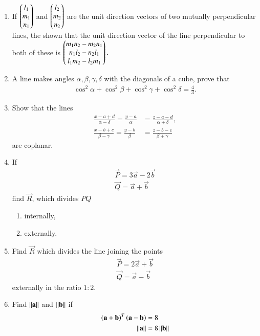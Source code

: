 \renewcommand{\theequation}{\theenumi}
\begin{enumerate}[label=\arabic*.,ref=\thesubsection.\theenumi]
%
\item If 
$
\begin{pmatrix}l_1\\m_1\\n_1\end{pmatrix}
$
and
$
\begin{pmatrix}l_2\\m_2\\n_2\end{pmatrix}
$
are the unit direction vectors of two mutually perpendicular lines, the shown that the unit direction vector of the line perpendicular to both of these is
$
\begin{pmatrix}m_1n_2-m_2n_1\\n_1l_2-n_2l_1\\l_1m_2-l_2m_1\end{pmatrix}.
$
\item A line makes angles $\alpha, \beta, \gamma, \delta$ with the diagonals of a cube, prove that \begin{align}
\cos^2\alpha + \cos^2\beta + \cos^2\gamma +\cos^2\delta = \frac{4}{3}.
\end{align}
\item Show that the lines 
\begin{align}
\frac{x-a+d}{\alpha-\delta} = \frac{y-a}{\alpha} &= \frac{z-a-d}{\alpha+\delta}, 
\\
\frac{x-b+c}{\beta-\gamma} = \frac{y-b}{\beta} &= \frac{z-b-c}{\beta+\gamma} 
\end{align}
%
are coplanar.
\item If 
\begin{align}
\vec{P} = 3\vec{a}-2\vec{b}
\\
\vec{Q} = \vec{a}+\vec{b}
\end{align}
%
find $\vec{R}$, which divides $PQ$ 
\begin{enumerate}
\item internally,
\item externally.
\end{enumerate}
\item Find $\vec{R}$ which divides the line joining the points 
\begin{align}
\vec{P} = 2\vec{a}+\vec{b}
\\
\vec{Q} = \vec{a}-\vec{b}
\end{align}
externally in the ratio $1:2$.
\item Find $\left\lVert\mathbf{a}\right\rVert$ and $\left\lVert\mathbf{b}\right\rVert$ if 
\begin{align}
\left(\mathbf{a}+\mathbf{b}\right)^T\left(\mathbf{a}-\mathbf{b}\right) &= 8
\\
\left\lVert\mathbf{a}\right\rVert&=8\left\lVert\mathbf{b}\right\rVert
\end{align}

\end{enumerate}
